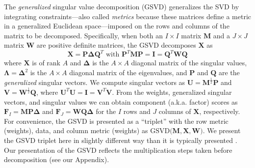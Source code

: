 \documentclass[12pt]{article}
\begin{document}
The \emph{generalized} singular value decomposition (GSVD) generalizes
the SVD by integrating constraints---also called \emph{metrics} because
these matrices define a metric in a generalized Euclidean
space---imposed on the rows and columns of the matrix to be decomposed.
Specifically, when both an \(I\times I\) matrix \({\mathbf M}\) and a
\(J\times J\) matrix \({\mathbf W}\) are positive definite matrices, the
GSVD decomposes \({\mathbf X}\) as \begin{equation}\label{eq:gsvd}
{\mathbf X} = {\mathbf P}{\boldsymbol \Delta} {\mathbf Q}^{T} 
\textrm{ with }
{\mathbf P}^{T}{\mathbf M}{\mathbf P} = {\mathbf I} = {\mathbf Q}^{T}{\mathbf W}{\mathbf Q}
\end{equation} where \({\mathbf X}\) is of rank \(A\) and
\({\boldsymbol \Delta}\) is the \(A \times A\) diagonal matrix of the
singular values, \({\boldsymbol \Lambda} = {\boldsymbol \Delta}^2\) is
the \(A \times A\) diagonal matrix of the eigenvalues, and
\({\mathbf P}\) and \({\mathbf Q}\) are the \emph{generalized} singular
vectors. We compute singular vectors as
\({\mathbf U} = {\mathbf M}^{\frac{1}{2}}{\mathbf P}\) and
\({\mathbf V} = {\mathbf W}^{\frac{1}{2}}{\mathbf Q}\), where
\({\mathbf U}^{T}{\mathbf U} = {\mathbf I} = {\mathbf V}^{T}{\mathbf V}\).
From the weights, generalized singular vectors, and singular values we
can obtain component (a.k.a. factor) scores as
\({\mathbf F}_{I} = {\mathbf M}{\mathbf P}{\boldsymbol \Delta}\) and
\({\mathbf F}_{J} = {\mathbf W}{\mathbf Q}{\boldsymbol \Delta}\) for the
\(I\) rows and \(J\) columns of \({\mathbf X}\), respectively. For
convenience, the GSVD is presented as a ``triplet'' with the row metric
(weights), data, and column metric (weights) as
\(\mathrm{GSVD(}{\mathbf M}, {\mathbf X}, {\mathbf W}\mathrm{)}\). We
present the GSVD triplet here in slightly different way than it is
typically presented \citep[see, e.g.,][]{holmes_multivariate_2008}. Our
presentation of the GSVD reflects the multiplication steps taken before
decomposition (see our Appendix).
\end{document}
